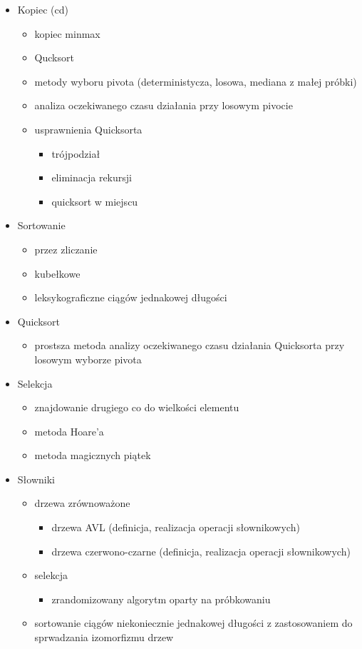 \begin{itemize}
\item Kopiec (cd)
\begin{itemize}
	\item kopiec minmax
	\item Qucksort
	\item metody wyboru pivota (deterministycza, losowa, mediana z małej próbki)
	\item analiza oczekiwanego czasu działania przy losowym pivocie
	\item usprawnienia Quicksorta
	\begin{itemize}
		\item trójpodział
		\item eliminacja rekursji
		\item quicksort w miejscu
	\end{itemize}
\end{itemize}

\item Sortowanie
\begin{itemize}
	\item przez zliczanie
	\item kubełkowe
	\item leksykograficzne ciągów jednakowej długości
\end{itemize}

\item Quicksort
\begin{itemize}
	\item prostsza metoda analizy oczekiwanego czasu działania Quicksorta przy losowym wyborze pivota
\end{itemize}

\item Selekcja
\begin{itemize}
	\item znajdowanie drugiego co do wielkości elementu
	\item metoda Hoare'a
	\item metoda magicznych piątek
\end{itemize}

\item Słowniki
\begin{itemize}
	\item drzewa zrównoważone
	\begin{itemize}
		\item drzewa AVL (definicja, realizacja operacji słownikowych)
		\item drzewa czerwono-czarne (definicja, realizacja operacji słownikowych)
	\end{itemize}
	\item selekcja
	\begin{itemize}
		\item zrandomizowany algorytm oparty na próbkowaniu
	\end{itemize}
	\item sortowanie ciągów niekoniecznie jednakowej długości z zastosowaniem do sprwadzania izomorfizmu drzew
\end{itemize}


\end{itemize}
